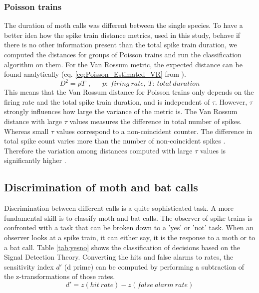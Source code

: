 \documentclass[12pt,a4paper,pdftex]{article}
\begin{document}
\subsubsection*{Poisson trains}
The duration of moth calls was different between the single species. To have a better idea how the spike train distance metrics, used in this study, behave if there is no other information present than the total spike train duration, we computed the distances for groups of Poisson trains and run the classification algorithm on them.
For the Van Rossum metric, the expected distance can be found analytically (eq. \ref{eq:Poisson_Estimated_VR} from \cite{rossum2001}). 
\begin{equation}
\label{eq:Poisson_Estimated_VR}
D^{2} = pT~~,~~~~~~~p:~firing~rate,~T:~total~duration
\end{equation}
This means that the Van Rossum distance for Poisson trains only depends on the firing rate and the total spike train duration, and is independent of $ \tau $. However, $ \tau $ strongly influences how large the variance of the metric is. The Van Rossum distance with large $ \tau $ values measures the difference in total number of spikes. Whereas small $ \tau $ values correspond to  a non-coincident counter. The difference in total spike count varies more than the number of non-coincident spikes \cite{rossum2001}. Therefore the variation among distances computed with large $ \tau $ values is significantly higher \cite{rossum2001}. 

\newpage
\subsection*{Discrimination of moth and bat calls}
\label{MvsBMethods}
Discrimination between different calls is a quite sophisticated task. A more fundamental skill is to classify moth and bat calls. The observer of spike trains is confronted with a task that can be broken down to a 'yes' or 'not' task. When an observer looks at a spike train, it can either say, it is the response to a moth or to a bat call. Table \ref{tab:yesno} shows the classification of decisions based on the Signal Detection Theory. Converting the hits and false alarms to rates, the sensitivity index $d'$ (d prime) can be computed by performing a subtraction of the z-transformations of those rates.
\begin{equation}
\label{eq:dprime}
d' = z(hit~rate) - z(false~alarm~rate)
\end{equation}
\end{document}
